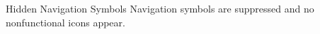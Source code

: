 \documentclass[14pt,t]{beamer}
\begin{document}
\begin{frame}{Hidden Navigation Symbols}
Navigation symbols are suppressed and no nonfunctional icons appear.
\end{frame}
\end{document}
